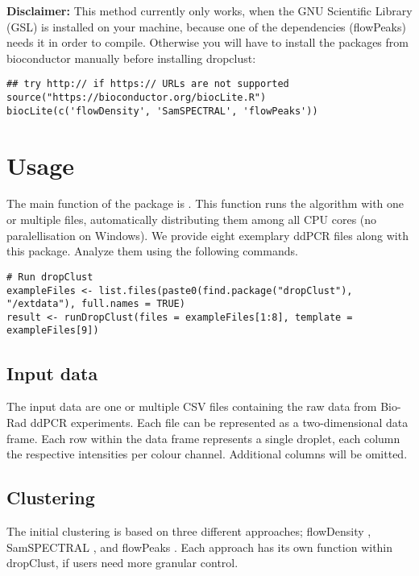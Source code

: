 \documentclass{article}
\begin{document}
\textbf{Disclaimer:} This method currently only works, when the GNU Scientific Library (GSL) is installed on your machine, because one of the dependencies (flowPeaks) needs it in order to compile. Otherwise you will have to install the packages from bioconductor manually before installing dropclust:

\begin{verbatim}
## try http:// if https:// URLs are not supported
source("https://bioconductor.org/biocLite.R")
biocLite(c('flowDensity', 'SamSPECTRAL', 'flowPeaks'))
\end{verbatim}

\section{Usage}
The main function of the package is . This function runs the algorithm with one or multiple files, automatically distributing them among all CPU cores (no paralellisation on Windows). We provide eight exemplary ddPCR files along with this package. Analyze them using the following commands.

\begin{verbatim}
# Run dropClust
exampleFiles <- list.files(paste0(find.package("dropClust"), "/extdata"), full.names = TRUE)
result <- runDropClust(files = exampleFiles[1:8], template = exampleFiles[9])
\end{verbatim}

\subsection{Input data}
The input data are one or multiple CSV files containing the raw data from Bio-Rad ddPCR experiments. Each file can be represented as a two-dimensional data frame. Each row within the data frame represents a single droplet, each column the respective intensities per colour channel. Additional columns will be omitted.

\subsection{Clustering}
The initial clustering is based on three different approaches; flowDensity \cite{malek2015flowdensity}, SamSPECTRAL \cite{zare2010data}, and flowPeaks \cite{ge2012flowpeaks}. Each approach has its own function within dropClust, if users need more granular control.
\end{document}
